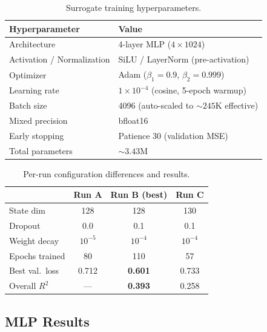 \documentclass[11pt]{article}
\begin{document}
\begin{table}[H]
  \centering
  \small
  \renewcommand{\arraystretch}{1.3}
  \caption{Surrogate training hyperparameters.}
  \label{tab:hyperparams-common}
  \begin{tabular}{@{}ll@{}}
    \toprule
    \textbf{Hyperparameter} & \textbf{Value} \\
    \midrule
    Architecture & 4-layer MLP ($4 \times 1024$) \\
    Activation / Normalization & SiLU / LayerNorm (pre-activation) \\
    Optimizer & Adam ($\beta_1{=}0.9$, $\beta_2{=}0.999$) \\
    Learning rate & $1 \times 10^{-4}$ (cosine, 5-epoch warmup) \\
    Batch size & 4096 (auto-scaled to ${\sim}245$K effective) \\
    Mixed precision & bfloat16 \\
    Early stopping & Patience 30 (validation MSE) \\
    Total parameters & ${\sim}3.43$M \\
    \bottomrule
  \end{tabular}
\end{table}

\begin{table}[H]
  \centering
  \small
  \renewcommand{\arraystretch}{1.3}
  \caption{Per-run configuration differences and results.}
  \label{tab:hyperparams-runs}
  \begin{tabular}{@{}lccc@{}}
    \toprule
    & \textbf{Run A} & \textbf{Run B (best)} & \textbf{Run C} \\
    \midrule
    State dim & 128 & 128 & 130 \\
    Dropout & 0.0 & 0.1 & 0.1 \\
    Weight decay & $10^{-5}$ & $10^{-4}$ & $10^{-4}$ \\
    Epochs trained & 80 & 110 & 57 \\
    Best val.\ loss & 0.712 & \textbf{0.601} & 0.733 \\
    Overall $R^2$ & --- & \textbf{0.393} & 0.258 \\
    \bottomrule
  \end{tabular}
\end{table}

\subsection{MLP Results}
\label{sec:surrogate:results}
\end{document}
